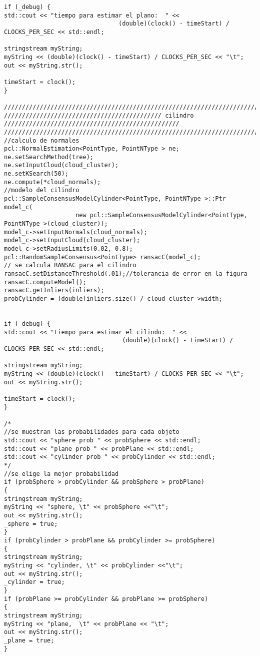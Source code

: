 {\begin{lstlisting}[caption={Archivo test.cpp}]
if (_debug) {
std::cout << "tiempo para estimar el plano:  " << 
								(double)(clock() - timeStart) / CLOCKS_PER_SEC << std::endl;

stringstream myString;
myString << (double)(clock() - timeStart) / CLOCKS_PER_SEC << "\t";
out << myString.str();

timeStart = clock();
}

///////////////////////////////////////////////////////////////////////////////////////////////////////
//////////////////////////////////////////// cilindro /////////////////////////////////////////////////
///////////////////////////////////////////////////////////////////////////////////////////////////////
//calculo de normales
pcl::NormalEstimation<PointType, PointNType > ne;
ne.setSearchMethod(tree);
ne.setInputCloud(cloud_cluster);
ne.setKSearch(50);
ne.compute(*cloud_normals);
//modelo del cilindro
pcl::SampleConsensusModelCylinder<PointType, PointNType >::Ptr model_c(
					new pcl::SampleConsensusModelCylinder<PointType, PointNType >(cloud_cluster));
model_c->setInputNormals(cloud_normals);
model_c->setInputCloud(cloud_cluster);
model_c->setRadiusLimits(0.02, 0.8);
pcl::RandomSampleConsensus<PointType> ransacC(model_c);
// se calcula RANSAC para el cilindro 
ransacC.setDistanceThreshold(.01);//tolerancia de error en la figura
ransacC.computeModel();
ransacC.getInliers(inliers);
probCylinder = (double)inliers.size() / cloud_cluster->width;


if (_debug) {
std::cout << "tiempo para estimar el cilindo:  " <<
								 (double)(clock() - timeStart) / CLOCKS_PER_SEC << std::endl;

stringstream myString;
myString << (double)(clock() - timeStart) / CLOCKS_PER_SEC << "\t";
out << myString.str();

timeStart = clock();
}

/*
//se muestran las probabilidades para cada objeto
std::cout << "sphere prob " << probSphere << std::endl;
std::cout << "plane prob " << probPlane << std::endl;
std::cout << "cylinder prob " << probCylinder << std::endl;
*/
//se elige la mejor probabilidad
if (probSphere > probCylinder && probSphere > probPlane)
{
stringstream myString;
myString << "sphere, \t" << probSphere <<"\t";
out << myString.str();
_sphere = true;
}
if (probCylinder > probPlane && probCylinder >= probSphere)
{
stringstream myString;
myString << "cylinder, \t" << probCylinder <<"\t";
out << myString.str();
_cylinder = true;
}
if (probPlane >= probCylinder && probPlane >= probSphere)
{
stringstream myString;
myString << "plane,  \t" << probPlane << "\t";
out << myString.str();
_plane = true;
}


\end{lstlisting}}
